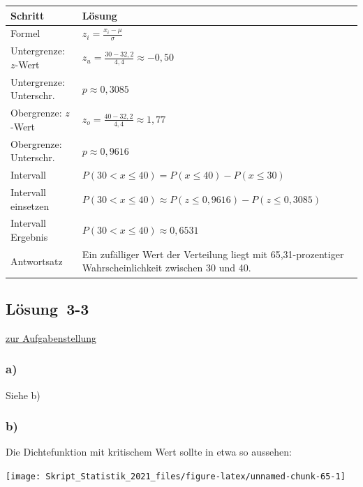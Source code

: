 \documentclass[
  11pt,
  ngerman,
  a4paper,
]{report}
\begin{document}
\begin{table}[H]
\centering
\begin{tabular}{ll}
\toprule
Schritt & Lösung\\
\midrule
Formel & $z_{i} = \frac{x_{i} - \mu}{\sigma}$\\
Untergrenze: $z$-Wert & $z_{u}=\frac{30-32{,}2}{4{,}4}\approx-0{,}50$\\
Untergrenze: Unterschr. & $p \approx 0{,}3085$\\
Obergrenze: $z$-Wert & $z_{o}=\frac{40-32{,}2}{4{,}4}\approx1{,}77$\\
Obergrenze: Unterschr. & $p \approx 0{,}9616$\\
Intervall & $P(30 < x \leq 40) = P(x \leq 40) - P(x \leq 30)$\\
Intervall einsetzen & $P(30 < x \leq 40) \approx P(z \leq 0{,}9616) - P(z \leq 0{,}3085)$\\
Intervall Ergebnis & $P(30 < x \leq 40) \approx 0{,}6531$\\
Antwortsatz & Ein zufälliger Wert der Verteilung liegt mit 65,31-prozentiger Wahrscheinlichkeit zwischen 30 und 40.\\
\bottomrule
\end{tabular}
\end{table}

\hypertarget{loesung-3-3}{%
\subsection{Lösung~3-3}\label{loesung-3-3}}

\protect\hyperlink{aufgabe-3-3}{zur Aufgabenstellung}

\hypertarget{a-10}{%
\subsubsection{a)}\label{a-10}}

Siehe b)

\hypertarget{b-10}{%
\subsubsection{b)}\label{b-10}}

Die Dichtefunktion mit kritischem Wert sollte in etwa so aussehen:

\begin{center}\texttt{[image: Skript\_Statistik\_2021\_files/figure-latex/unnamed-chunk-65-1]} \end{center}
\end{document}
